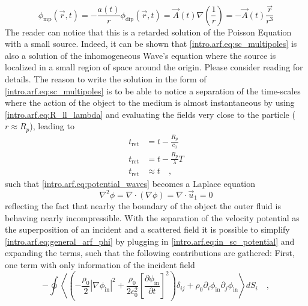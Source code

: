 \begin{subequations}
\begin{equation}\label{intro.arf.eq:monopolar_phi}
    \phi_{\text{mp}}(\vec r,t) = -\frac{a(t)}{r}
\end{equation}
\begin{equation}\label{intro.arf.eq:dipolar_phi}
    \phi_{\text{dip}}(\vec r,t) = \vec A(t)\nabla\left(\frac{1}{r}\right) = -\vec A(t)\frac{\vec r}{r^3}
\end{equation}
\end{subequations}
The reader can notice that this is a retarded solution of the Poisson Equation with a small source. Indeed, it can be shown that \eqref{intro.arf.eq:sc_multipoles} is also a solution of the inhomogeneous Wave's equation where the source is localized in a small region of space around the origin. Please consider reading \cite[sec.~6.4]{Jackson} for details. The reason to write the solution in the form of \eqref{intro.arf.eq:sc_multipoles} is to be able to notice a separation of the time-scales where the action of the object to the medium is almost instantaneous by using \eqref{intro.arf.eq:R_ll_lambda} and evaluating the fields very close to the particle ($r \approx R_p $), leading to
\begin{align}
    t_{\text{ret}} &= t - \frac{R_p}{c_0} \nonumber\\
    t_{\text{ret}} &= t - \frac{R_p}{\lambda}T \nonumber\\
    t_{\text{ret}} &\approx t\quad,\label{intro.arf.eq:t_ret_approx}
\end{align}
such that \eqref{intro.arf.eq:potential_waves} becomes a Laplace equation
\begin{equation}\label{intro.arf.eq:laplace_potential}
    \nabla^2\phi = \nabla\cdot(\nabla\phi) = \nabla\cdot\vec u_1 = 0
\end{equation}
reflecting the fact that nearby the boundary of the object the outer fluid is behaving nearly incompressible. With the separation of the velocity potential as the superposition of an incident and a scattered field it is possible to simplify \eqref{intro.arf.eq:general_arf_phi} by plugging in \eqref{intro.arf.eq:in_sc_potential} and expanding the terms, such that the following contributions are gathered: First, one term with only information of the incident field
\begin{equation}\label{intro.arf.eq:force_in_in}
    -\oint\left\langle\left(-\frac{\rho_0}{2}|\nabla\phi_{\text{in}}|^2 + \frac{\rho_0}{2c_0^2}\left[\frac{\partial\phi_{\text{in}}}{\partial t}\right]^2\right)\delta_{ij} + \rho_0\partial_i\phi_{\text{in}}\partial_j\phi_{\text{in}}\right\rangle dS_i\quad,
\end{equation}
